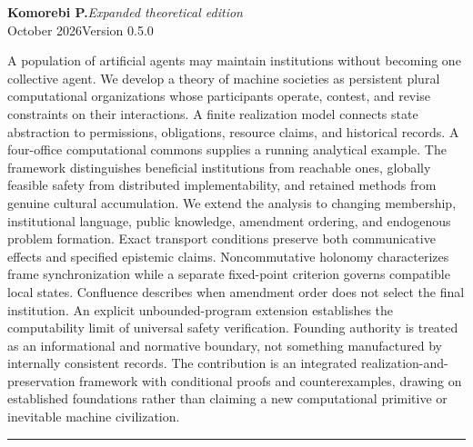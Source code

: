 \documentclass[11pt,letterpaper]{article}
\theoremstyle{plain}
\theoremstyle{definition}
\theoremstyle{remark}
\begin{document}
\hypersetup{pageanchor=false}
\begin{titlepage}
\thispagestyle{empty}
\vspace*{.25in}
\par
\vspace{.67in}
\vspace{.18in}
\vspace{.27in}
\noindent{\color{ink}\rule{\textwidth}{0.85pt}}\par
\vspace{.16in}
\noindent\textbf{Komorebi P.}\hfill\textit{Expanded theoretical edition}\\
 October 2026\hfill Version 0.5.0\par
\vspace{.48in}
\par\smallskip
\noindent A population of artificial agents may maintain institutions without becoming one collective agent. We develop a theory of machine societies as persistent plural computational organizations whose participants operate, contest, and revise constraints on their interactions. A finite realization model connects state abstraction to permissions, obligations, resource claims, and historical records. A four-office computational commons supplies a running analytical example. The framework distinguishes beneficial institutions from reachable ones, globally feasible safety from distributed implementability, and retained methods from genuine cultural accumulation. We extend the analysis to changing membership, institutional language, public knowledge, amendment ordering, and endogenous problem formation. Exact transport conditions preserve both communicative effects and specified epistemic claims. Noncommutative holonomy characterizes frame synchronization while a separate fixed-point criterion governs compatible local states. Confluence describes when amendment order does not select the final institution. An explicit unbounded-program extension establishes the computability limit of universal safety verification. Founding authority is treated as an informational and normative boundary, not something manufactured by internally consistent records. The contribution is an integrated realization-and-preservation framework with conditional proofs and counterexamples, drawing on established foundations rather than claiming a new computational primitive or inevitable machine civilization.
\vfill
\noindent\rule{\textwidth}{.4pt}\par\smallskip
{}
\end{titlepage}
\end{document}
